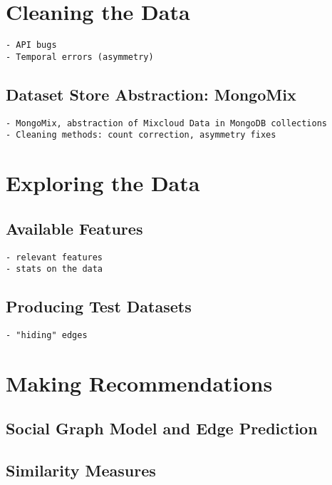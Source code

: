 \documentclass[a4paper,12pt,twoside,notitlepage]{report}
\begin{document}
\section{Cleaning the Data}

\begin{verbatim}
- API bugs
- Temporal errors (asymmetry)
\end{verbatim}

\subsection{Dataset Store Abstraction: MongoMix}
\begin{verbatim}
- MongoMix, abstraction of Mixcloud Data in MongoDB collections
- Cleaning methods: count correction, asymmetry fixes
\end{verbatim}

\section{Exploring the Data}

\subsection{Available Features}
\begin{verbatim}
- relevant features
- stats on the data
\end{verbatim}

\subsection{Producing Test Datasets}
\begin{verbatim}
- "hiding" edges
\end{verbatim}

\section{Making Recommendations}

\subsection{Social Graph Model and Edge Prediction}

\subsection{Similarity Measures}
\end{document}
